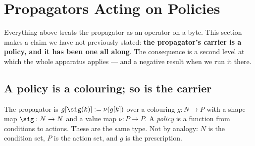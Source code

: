 %
%
%

\section{Propagators Acting on Policies}
\label{sec:policies}

Everything above treats the propagator as an operator on a byte. This section
makes a claim we have not previously stated: \textbf{the propagator's carrier is
a policy, and it has been one all along}. The consequence is a second level at
which the whole apparatus applies --- and a negative result when we run it there.

\subsection{A policy is a colouring; so is the carrier}

The propagator is $g[\sig(k)] := \nu(g[k])$ over a colouring $g : N \to P$ with a
shape map $\sig : N \to N$ and a value map $\nu : P \to P$. A \emph{policy} is a
function from conditions to actions. These are the same type. Not by analogy:
$N$ is the condition set, $P$ is the action set, and $g$ is the prescription.

